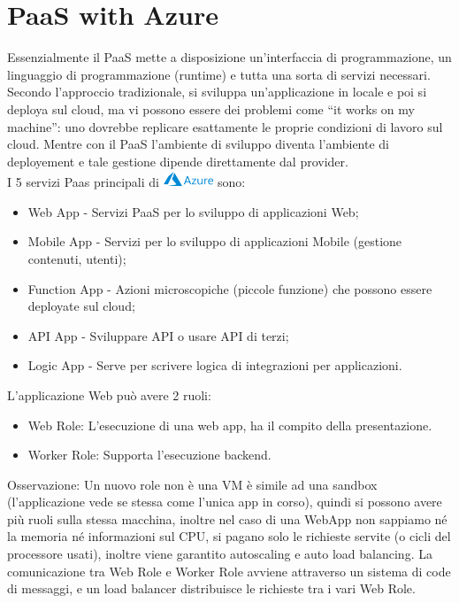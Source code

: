 \documentclass[11pt, twocolumn]{article}
\newenvironment{myitemize}
{ \begin{itemize}[topsep=0ex]
		\setlength{\itemsep}{0pt}
		\setlength{\parskip}{0pt}
		\setlength{\parsep}{0pt}     }
	{ \end{itemize}                  }
\begin{document}
\section{PaaS with Azure}
Essenzialmente il PaaS mette a disposizione un'interfaccia di programmazione, un linguaggio di programmazione (runtime) e tutta una sorta di servizi necessari. 
Secondo l'approccio tradizionale, si sviluppa un'applicazione in locale e poi si deploya sul cloud, ma vi possono essere dei problemi come ``it works on my machine'': uno dovrebbe replicare esattamente le proprie condizioni di lavoro sul cloud.
Mentre con il PaaS l'ambiente di sviluppo diventa l'ambiente di deployement e tale gestione dipende direttamente dal provider.\\
I 5 servizi Paas principali di \includegraphics[width=1.5cm,height=0.5cm]{imgs/azureLogo.png} sono:
\begin{myitemize}
	\item Web App - Servizi PaaS per lo sviluppo di applicazioni Web;
	\item Mobile App - Servizi per lo sviluppo di applicazioni Mobile (gestione contenuti, utenti);
	\item Function App - Azioni microscopiche (piccole funzione) che possono essere deployate sul cloud;
	\item API App - Sviluppare API o usare API di terzi;
	\item Logic App - Serve per scrivere logica di integrazioni per applicazioni.
\end{myitemize}
L'applicazione Web può avere 2 ruoli:
\begin{myitemize}
	\item Web Role: L'esecuzione di una web app, ha il compito della presentazione.
	\item Worker Role: Supporta l'esecuzione backend.
\end{myitemize}
Osservazione: Un nuovo role non è una VM è simile ad una sandbox (l'applicazione vede se stessa come l'unica app in corso), quindi si possono avere più ruoli sulla stessa macchina, inoltre nel caso di una WebApp non sappiamo né la memoria né informazioni sul CPU, si pagano solo le richieste servite (o cicli del processore usati), inoltre viene garantito autoscaling e auto load balancing.
La comunicazione tra Web Role e Worker Role avviene attraverso un sistema di code di messaggi, e un load balancer distribuisce le richieste tra i vari Web Role.\\
\end{document}
